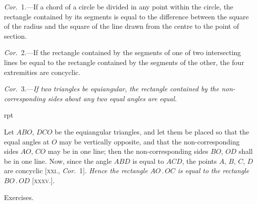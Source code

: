 \documentclass[oneside]{book}
\newcommand\exhead[1]{
\Needspace*{5\baselineskip}\begin{center}
\textsf{#1}
\end{center}
}
\newcommand\imgflow[3]{
\setcounter{wrapwidth}{#1}
\begin{wrapfigure}[#2]{r}{\value{wrapwidth}pt}
\begin{center}
\vspace{-0.3in}
\end{center}
\end{wrapfigure}
}
\begin{document}
\emph{Cor.}~1.---If a chord of a circle
be divided in any point within
the circle, the rectangle contained by its segments is
equal to the difference between the square of the
radius and the square of the line drawn from the
centre to the point of section.

\emph{Cor.}~2.---If the rectangle contained by the segments
of one of two intersecting lines be equal to the rectangle
contained by the segments of the other, the four
extremities are concyclic.

\textit{Cor.}~3.---\textit{If two triangles be equiangular, the rectangle
contained by the non-corresponding
sides about any two equal angles are
equal.}

\imgflow{100}{9}{f146}
Let $ABO$, $DCO$ be the equiangular
triangles, and let them be
placed so that the equal angles at
$O$ may be vertically opposite, and
that the non-corresponding sides
$AO$, $CO$ may be in one line; then
the non-corresponding sides $BO$, $OD$ shall be in one
line. Now, since the angle $ABD$ is equal to $ACD$, the
points $A$, $B$, $C$, $D$ are concyclic\label{concylic2} [\textsc{xxi.}, \emph{Cor.}~1]. \emph{Hence
the rectangle $AO\,.\,OC$ is equal to the rectangle $BO\,.\,OD$}
[\textsc{xxxv}.].

\exhead{Exercises.}
\end{document}
